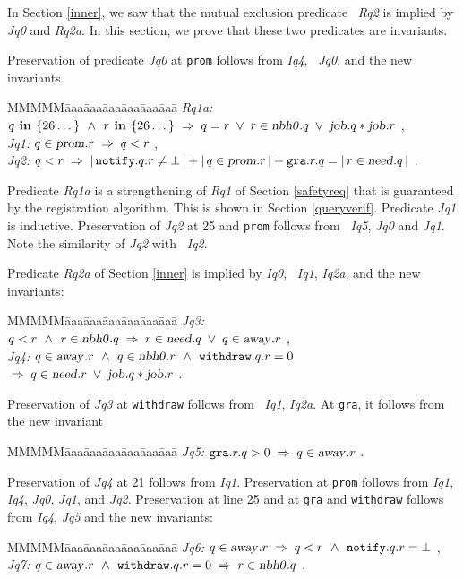 \documentclass[10pt]{article} \usepackage[english]{babel}
\newenvironment{tab}{\begin{tabbing}
MMMMM\=aaa\=aaa\=aaa\=aaa\=aaa\=aaa\= \kill}{\end{tabbing}}
\def\S #1/{\mbox {\textsl{#1}}}
\def\B #1/{\mbox {\textbf{#1}}}
\def\T #1/{\mbox {\texttt{#1}}}
\def\Implies{\;\Rightarrow\;}
\def\Land   {\mbox{ $\;\land\;$ }}
\def\Lor    {\;\lor\;}
\begin{document}
In Section \ref{inner}, we saw that the mutual exclusion predicate \S
Rq2/ is implied by \S Jq0/ and \S Rq2a/.  In this section, we prove
that these two predicates are invariants.

Preservation of predicate \S Jq0/ at \T prom/ follows from \S Iq4/, \S
Jq0/, and the new invariants
\begin{tab}
  \S Rq1a:/ \> $ q\B\ in /\{26\dots\} \Land r\B\ in /\{26\dots\}
  \Implies q = r \Lor r\in\S nbh0/.q \Lor \S job/.q * \S job/.r $ ,\\
  \S Jq1:/ \> $ q\in\S prom/.r \Implies q < r $ ,\\
  \S Jq2:/ \> $ q < r\Implies |\,\T notify/.q.r \ne\bot \,| +
  |\,q\in\S prom/.r\,| + \T gra/.r.q = |\, r\in\S need/.q\,| $ .
\end{tab}
Predicate \S Rq1a/ is a strengthening of \S Rq1/ of Section
\ref{safetyreq} that is guaranteed by the registration algorithm.
This is shown in Section \ref{queryverif}.  Predicate \S Jq1/ is
inductive.  Preservation of \S Jq2/ at 25 and \T prom/ follows from \S
Iq5/, \S Jq0/ and \S Jq1/.  Note the similarity of \S Jq2/ with \S
Iq2/.

Predicate \S Rq2a/ of Section \ref{inner} is implied by \S Iq0/, \S
Iq1/, \S Iq2a/, and the new invariants:
\begin{tab}
\S Jq3:/ \> $ q < r \Land  r\in\S nbh0/.q
\Implies r\in\S need/.q\Lor q \in\S away/.r $ ,\\
\S Jq4:/ \> $ q\in\S away/.r \Land q\in \S nbh0/.r 
\Land \T withdraw/.q.r = 0 $\\
\> $ \Implies q\in\S need/.r\Lor \S job/.q *\S job/.r$ .
\end{tab}

Preservation of \S Jq3/ at \T withdraw/ follows from \S
Iq1/, \S Iq2a/.  At \T gra/, it follows from the new invariant 
\begin{tab}
  \S Jq5:/ \> $ \T gra/.r.q > 0 \Implies q\in\S away/.r $ .
\end{tab}

Preservation of \S Jq4/ at 21 follows from \S Iq1/.  Preservation at
\T prom/ follows from \S Iq1/, \S Iq4/, \S Jq0/, \S Jq1/, and \S Jq2/.
Preservation at line 25 and at \T gra/ and \T withdraw/ follows from
\S Iq4/, \S Jq5/ and the new invariants:
\begin{tab}
  \S Jq6:/ \> $ q \in\S away/.r \Implies
  q < r \Land \T notify/.q.r = \bot $ ,\\
  \S Jq7:/ \> $ q \in\S away/.r \Land \T withdraw/.q.r = 0 \Implies
  r\in\S nbh0/.q $ .
\end{tab}
\end{document}
